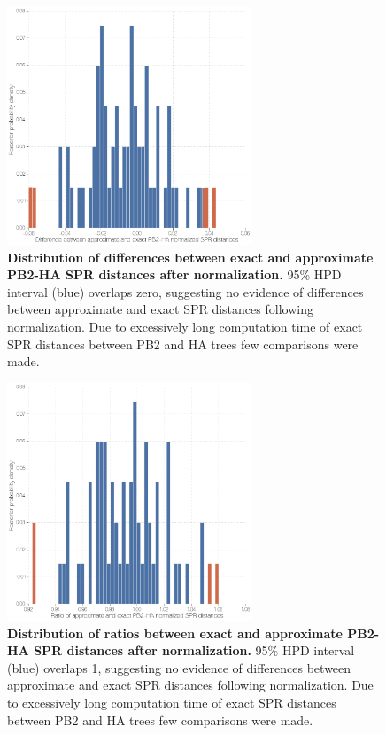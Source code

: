 \documentclass[11pt,oneside,letterpaper]{article}
\begin{document}
\begin{figure}
\centering  
\includegraphics[width=0.65\textwidth]  {supp_figures/InfB_supp_NormPB2-HA_hist.png}
\caption{\textbf{Distribution of differences between exact and approximate PB2-HA SPR distances after normalization.}
95\% HPD interval (blue) overlaps zero, suggesting no evidence of differences between approximate and exact SPR distances following normalization.
Due to excessively long computation time of exact SPR distances between PB2 and HA trees few comparisons were made.}
\label{NormSPR_PB2-HA_difference}
\end{figure}

\begin{figure}
\centering  
\includegraphics[width=0.65\textwidth]  {supp_figures/InfB_supp_NormPB2-HA_hist2.png}
\caption{\textbf{Distribution of ratios between exact and approximate PB2-HA SPR distances after normalization.}
95\% HPD interval (blue) overlaps 1, suggesting no evidence of differences between approximate and exact SPR distances following normalization.
Due to excessively long computation time of exact SPR distances between PB2 and HA trees few comparisons were made.}
\label{NormSPR_PB2-HA_ratio}
\end{figure}
\end{document}
